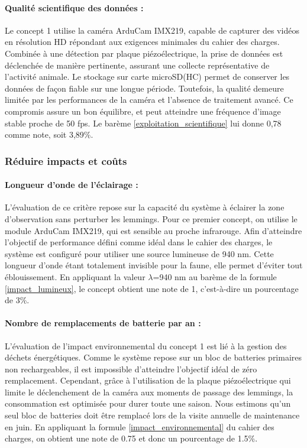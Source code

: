 \paragraph{Qualité scientifique des données :}
Le concept 1 utilise la caméra ArduCam IMX219, capable de capturer des vidéos en résolution HD répondant aux exigences minimales du cahier des charges.
Combinée à une détection par plaque piézoélectrique, la prise de données est déclenchée de manière pertinente, assurant une collecte représentative de l’activité animale.
Le stockage sur carte microSD(HC) permet de conserver les données de façon fiable sur une longue période.
Toutefois, la qualité demeure limitée par les performances de la caméra et l’absence de traitement avancé.
Ce compromis assure un bon équilibre, et peut atteindre une fréquence d'image stable proche de 50 fps.
Le barème \ref{exploitation_scientifique} lui donne 0,78 comme note, soit 3,89\%.


\subsubsection{Réduire impacts et coûts}

\paragraph{Longueur d'onde de l'éclairage :}
L'évaluation de ce critère repose sur la capacité du système à éclairer la zone d'observation sans perturber les lemmings. 
Pour ce premier concept, on utilise le module ArduCam IMX219, qui est sensible au proche infrarouge.
Afin d'atteindre l'objectif de performance défini comme idéal dans le cahier des charges, le système est configuré pour utiliser une source lumineuse de 940 nm. Cette longueur d'onde étant totalement invisible pour la faune, elle permet d'éviter tout éblouissement. 
En appliquant la valeur $\lambda$=940 nm au barème de la formule \ref{impact_lumineux}, le concept obtient une note de 1, c'est-à-dire un pourcentage de 3\%.


\paragraph{Nombre de remplacements de batterie par an :}
L’évaluation de l’impact environnemental du concept 1 est lié à la gestion des déchets énergétiques.
Comme le système repose sur un bloc de batteries primaires non rechargeables, il est impossible d’atteindre l’objectif idéal de zéro remplacement.
Cependant, grâce à l'utilisation de la plaque piézoélectrique qui limite le déclenchement de la caméra aux moments de passage des lemmings, la consommation est optimisée pour durer toute une saison.
Nous estimons qu'un seul bloc de batteries doit être remplacé lors de la visite annuelle de maintenance en juin. 
En appliquant la formule \ref{impact_environnemental} du cahier des charges, on obtient une note de 0.75 et donc un pourcentage de 1.5\%.


